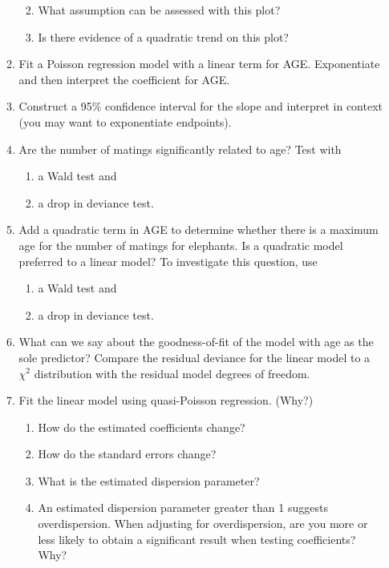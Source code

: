 \documentclass[
]{krantz}
\providecommand{\tightlist}{%
  \setlength{\itemsep}{0pt}\setlength{\parskip}{0pt}}
\begin{document}
\begin{enumerate}
\begin{enumerate}
    \begin{enumerate}
    \def\labelenumiii{\roman{enumiii}.}
    \tightlist
    \item
      What assumption can be assessed with this plot?
    \item
      Is there evidence of a quadratic trend on this plot?
    \end{enumerate}
  \item
    Fit a Poisson regression model with a linear term for AGE. Exponentiate and then interpret the coefficient for AGE.
  \item
    Construct a 95\% confidence interval for the slope and interpret in context (you may want to exponentiate endpoints).
  \item
    Are the number of matings significantly related to age? Test with

    \begin{enumerate}
    \def\labelenumiii{\roman{enumiii}.}
    \tightlist
    \item
      a Wald test and
    \item
      a drop in deviance test.
    \end{enumerate}
  \item
    Add a quadratic term in AGE to determine whether there is a maximum age for the number of matings for elephants. Is a quadratic model preferred to a linear model? To investigate this question, use

    \begin{enumerate}
    \def\labelenumiii{\roman{enumiii}.}
    \tightlist
    \item
      a Wald test and
    \item
      a drop in deviance test.
    \end{enumerate}
  \item
    What can we say about the goodness-of-fit of the model with age as the sole predictor? Compare the residual deviance for the linear model to a \(\chi^2\) distribution with the residual model degrees of freedom.
  \item
    Fit the linear model using quasi-Poisson regression. (Why?)

    \begin{enumerate}
    \def\labelenumiii{\roman{enumiii}.}
    \tightlist
    \item
      How do the estimated coefficients change?
    \item
      How do the standard errors change?
    \item
      What is the estimated dispersion parameter?
    \item
      An estimated dispersion parameter greater than 1 suggests overdispersion. When adjusting for overdispersion, are you more or less likely to obtain a significant result when testing coefficients? Why?
    \end{enumerate}
  \end{enumerate}
\end{enumerate}
\end{document}
